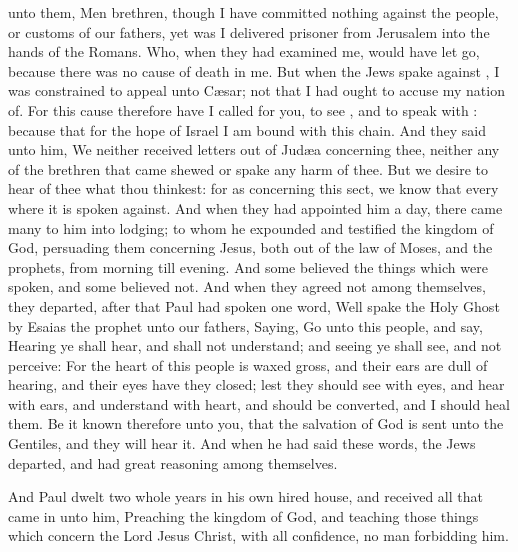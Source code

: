 {unto
them,
Men
{}
brethren, though
I have
committed
nothing
against the
people,
or
customs of our
fathers, yet was I
delivered
prisoner
from
Jerusalem
into the
hands of the
Romans.
Who, when they had
examined
me, would
have
let
{}
go,
because there
was
no
cause of
death
in
me.
But when the
Jews spake
against
{}, I was
constrained to
appeal unto
Cæsar;
not
that I
had
ought to
accuse
my
nation
of.
For
this
cause
therefore have I
called for
you, to
see
{},
and to speak
with
{}: because
that
for the
hope of
Israel I am bound
with
this
chain.
And they
said
unto
him,
We
neither
received
letters
out of
Judæa
concerning
thee,
neither
any of the
brethren that
came
shewed
or
spake
any
harm
of
thee.
But we
desire to
hear
of
thee
what thou
thinkest:
for
as
concerning
this
sect,
we
know
that every
where it
is spoken
against.
And when they had
appointed
him a
day, there
came
many
to
him
into
{}
lodging; to
whom he
expounded
and
testified the
kingdom of
God,
persuading
them
concerning
Jesus,
both
out of the
law of
Moses,
and
{} the
prophets,
from
morning
till
evening.
And
some
believed the
things which were
spoken,
and
some believed
not.
And
when they agreed
not
among
themselves, they
departed, after that
Paul had
spoken
one
word,
Well
spake the
Holy
Ghost
by
Esaias the
prophet
unto
our
fathers,
Saying,
Go
unto
this
people,
and
say,
Hearing ye shall
hear,
and
shall
not
understand;
and
seeing ye shall
see,
and
not
perceive:
For the
heart of
this
people is waxed
gross,
and their
ears
are dull
of
hearing,
and
their
eyes have they
closed;
lest they should
see
with
{}
eyes,
and
hear
with
{}
ears,
and
understand
with
{}
heart,
and should be
converted,
and I should
heal
them.
Be
it
known
therefore unto
you,
that the
salvation of
God is
sent unto the
Gentiles,
and
{}
they will hear
it.
And when
he had
said these
words, the
Jews
departed, and
had
great
reasoning
among
themselves.
\par }{\PP {}And
Paul
dwelt
two
whole
years
in his
own hired
house,
and
received
all that came
in
unto
him,
Preaching the
kingdom of
God,
and
teaching those
things which
concern the
Lord
Jesus
Christ,
with
all
confidence, no man forbidding
him.
\par }
